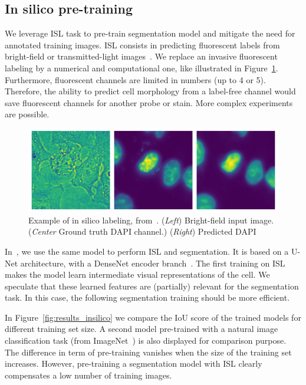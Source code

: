 \subsection{In silico pre-training}
\label{subsec:segmentation_insilico}

We leverage \ac{ISL} task to pre-train segmentation model and mitigate the need for annotated training images.
\ac{ISL} consists in predicting fluorescent labels from bright-field or transmitted-light images~\cite{christiansen_silico_2018, ounkomol_label_free_2018}.
We replace an invasive fluorescent labeling by a numerical and computational one, like illustrated in Figure~\ref{fig:example_insilico}.
Furthermore, fluorescent channels are limited in numbers (up to 4 or 5).
Therefore, the ability to predict cell morphology from a label-free channel would save fluorescent channels for another probe or stain.
More complex experiments are possible.

\begin{figure}[]
    \centering
    \includegraphics[width=\textwidth]{figures/chapter3/insilico_prediction}
    \caption[Example of in silico labeling]{Example of in silico labeling, from~\cite{anonymous_Bonte_2022}.
	(\textit{Left}) Bright-field input image.
	(\textit{Center} Ground truth DAPI channel.)
	(\textit{Right}) Predicted DAPI}
    \label{fig:example_insilico}
\end{figure}

In~\cite{anonymous_Bonte_2022}, we use the same model to perform \ac{ISL} and segmentation.
It is based on a U-Net architecture, with a DenseNet encoder branch~\cite{Huang_2017_CVPR}.
The first training on \ac{ISL} makes the model learn intermediate visual representations of the cell.
We speculate that these learned features are (partially) relevant for the segmentation task.
In this case, the following segmentation training should be more efficient.

In Figure~\ref{fig:results_insilico} we compare the \ac{IoU} score of the trained models for different training set size.
A second model pre-trained with a natural image classification task (from ImageNet~\cite{Deng_2009}) is also displayed for comparison purpose.
The difference in term of pre-training vanishes when the size of the training set increases.
However, pre-training a segmentation model with \ac{ISL} clearly compensates a low number of training images.

